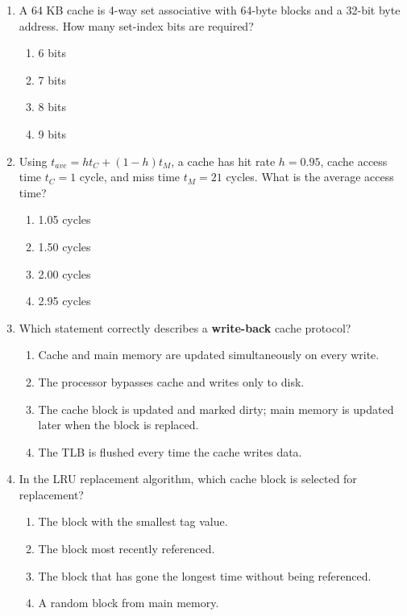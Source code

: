 \documentclass[a4paper,12pt]{article}
\begin{document}
\begin{enumerate}[label=\textbf{\arabic*.}]
    \item A 64 KB cache is 4-way set associative with 64-byte blocks and a 32-bit byte address. How many set-index bits are required?
    \begin{enumerate}[label=\alph*)]
        \item 6 bits
        \item 7 bits
        \item 8 bits
        \item 9 bits
    \end{enumerate}

    \item Using $t_{ave}=h t_C + (1-h)t_M$, a cache has hit rate $h=0.95$, cache access time $t_C=1$ cycle, and miss time $t_M=21$ cycles. What is the average access time?
    \begin{enumerate}[label=\alph*)]
        \item 1.05 cycles
        \item 1.50 cycles
        \item 2.00 cycles
        \item 2.95 cycles
    \end{enumerate}

    \item Which statement correctly describes a \textbf{write-back} cache protocol?
    \begin{enumerate}[label=\alph*)]
        \item Cache and main memory are updated simultaneously on every write.
        \item The processor bypasses cache and writes only to disk.
        \item The cache block is updated and marked dirty; main memory is updated later when the block is replaced.
        \item The TLB is flushed every time the cache writes data.
    \end{enumerate}

    \item In the LRU replacement algorithm, which cache block is selected for replacement?
    \begin{enumerate}[label=\alph*)]
        \item The block with the smallest tag value.
        \item The block most recently referenced.
        \item The block that has gone the longest time without being referenced.
        \item A random block from main memory.
    \end{enumerate}


\end{enumerate}
\end{document}
